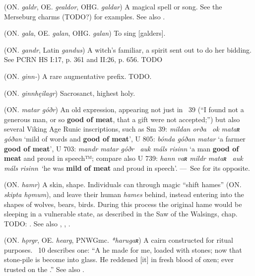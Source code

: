 \begin{itemize}
 (ON. \emph{galdr}, OE. \emph{gealdor}, OHG. \emph{galdar})
  A magical spell or song. See the Merseburg charms (TODO?) for examples. See also .

 (ON. \emph{gala}, OE. \emph{galan}, OHG. \emph{galan})
  To sing [galders].

 (ON. \emph{gandr}, Latin \emph{gandus})
  A witch’s familiar, a spirit sent out to do her bidding. See PCRN HS I:17, p. 361 and II:26, p. 656. TODO

 (ON. \emph{ginn-})
  A rare augmentative prefix. TODO.

 (ON. \emph{ginnhęilagr})
  Sacrosanct, highest holy.

 (ON. \emph{matar góðr})
   An old expression, appearing not just in \Havamal\ 39 (“I found not a generous man, or so \textbf{good of meat}, that a gift were not accepted;”) but also several Viking Age Runic inscriptions, such as Sm 39: \emph{mildan orða \hld\ ok mataʀ góðan} ‘mild of words and \textbf{good of meat}’, U 805: \emph{bónda góðan matar} ‘a farmer \textbf{good of meat}’, U 703: \emph{mandr matar góðr \hld\ auk máls risinn} ‘a man \textbf{good of meat} and proud in speech™; compare also U 739: \emph{hann vaʀ mildr mataʀ \hld\ auk máls risinn} ‘he was \textbf{mild of meat} and proud in speech’. — See  for its opposite.

 (ON. \emph{hamr})
  A skin, shape. Individuals can through magic “shift hames” (ON. \emph{skipta hǫmum}), and leave their human \emph{hames} behind, instead entering into the shapes of wolves, bears, birds. During this process the original hame would be sleeping in a vulnerable state, as described in the Saw of the Walsings, chap. TODO: . See also , , .

 (ON. \emph{hǫrgr}, OE. \emph{hearg}, PNWGmc. \emph{*harugaʀ})
  A cairn constructed for ritual purposes. \Hyndluljod\ 10 describes one: “A  he made for me, loaded with stones; now that stone-pile is become into glass. He reddened [it] in fresh blood of oxen;  ever trusted on the .” See also .


\end{itemize}
